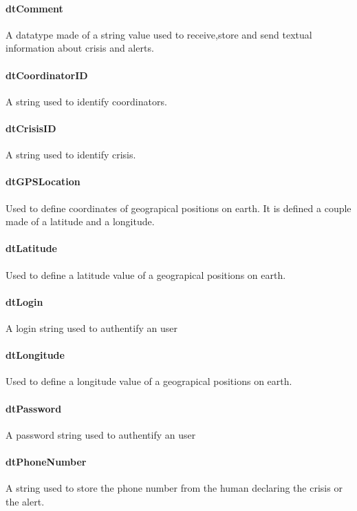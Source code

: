\paragraph*{\textbf{dtComment}}
A datatype made of a string value used to receive,store and send
textual information about crisis and alerts.

\paragraph*{\textbf{dtCoordinatorID}}
A string used to identify coordinators.

\paragraph*{\textbf{dtCrisisID}}
A string used to identify crisis.

\paragraph*{\textbf{dtGPSLocation}}
Used to define coordinates of geograpical positions on earth. It
is defined a couple made of a latitude and a longitude.

\paragraph*{\textbf{dtLatitude}}
Used to define a latitude value of a geograpical positions on earth.

\paragraph*{\textbf{dtLogin}}
A login string used to authentify an \mysystemname user

\paragraph*{\textbf{dtLongitude}}
Used to define a longitude value of a geograpical positions on
earth.

\paragraph*{\textbf{dtPassword}}
A password string used to authentify an \mysystemname user

\paragraph*{\textbf{dtPhoneNumber}}
A string used to store the phone number from the human declaring
the crisis or the alert.

